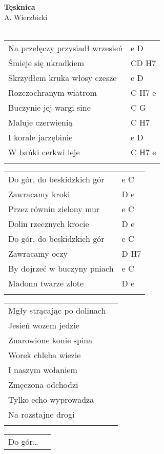 \documentclass[a5paper]{article}
\begin{document}


\noindent
\fontsize{12pt}{15pt}\selectfont
\textbf{Tęsknica} \\
\fontsize{8pt}{10pt}\selectfont
A. Wierzbicki \\ \\
\fontsize{10pt}{12pt}\selectfont
{}
\begin{tabular}{@{}p{6.50cm}p{3cm}@{}}
\noindent
Na przełęczy przysiadł wrzesień & e D \\
Śmieje się ukradkiem & CD H7 \\
Skrzydłem kruka włosy czesze & e D \\
Rozczochranym wiatrom & C H7 e \\
Buczynie jej wargi sine & C G \\
Maluje czerwienią & C H7 \\
I korale jarzębinie & e D \\
W bańki cerkwi leje & C H7 e \\ \\
\end{tabular}

\noindent
\begin{tabular}{@{}p{5.50cm}p{3cm}@{}}
Do gór, do beskidzkich gór & e C \\
Zawracamy kroki & D e \\
Przez równin zielony mur & e C \\
Dolin rzecznych krocie & D e \\
Do gór, do beskidzkich gór & e C \\
Zawracamy oczy & D H7 \\
By dojrzeć w buczyny pniach & e C \\
Madonn twarze złote & D e \\ \\
\end{tabular}

\noindent
\begin{tabular}{@{}p{5.50cm}p{3cm}@{}}
Mgły strącając po dolinach \\
Jesień wozem jedzie \\
Znarowione konie spina \\
Worek chleba wiezie \\
I naszym wołaniem \\ 
Zmęczona odchodzi\\
Tylko echo wyprowadza\\
Na rozstajne drogi\\ \\
\end{tabular}

\noindent
\begin{tabular}{@{}p{5.50cm}p{3cm}@{}}
Do gór…
\end{tabular}
\end{document}
